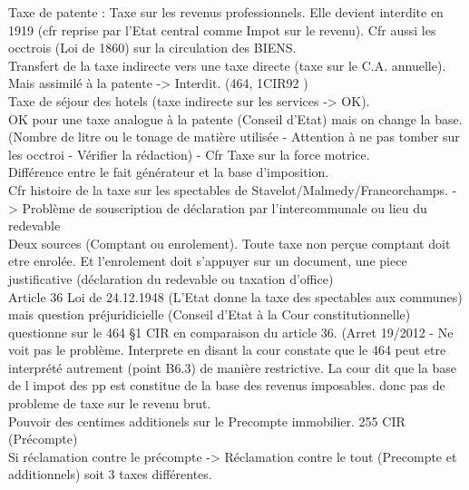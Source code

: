 \documentclass{book}
\begin{document}
\null

Taxe de patente : Taxe sur les revenus professionnels. Elle devient interdite en 1919 (cfr reprise par l'Etat central comme Impot sur le revenu). Cfr aussi les occtrois (Loi de 1860) sur la circulation des BIENS.\\

Transfert de la taxe indirecte vers une taxe directe (taxe sur le C.A. annuelle). Mais assimilé à la patente -> Interdit. (464, 1\degre CIR92 )\\

Taxe de séjour des hotels (taxe indirecte sur les services -> OK).\\

OK pour une taxe analogue à la patente (Conseil d'Etat) mais on change la base. (Nombre de litre ou le tonage de matière utilisée - Attention à ne pas tomber sur les occtroi - Vérifier la rédaction) - Cfr Taxe sur la force motrice.\\

Différence entre le fait générateur et la base d'imposition.\\

Cfr histoire de la taxe sur les spectables de Stavelot/Malmedy/Francorchamps. -> Problème de souscription de déclaration par l'intercommunale ou lieu du redevable\\

Deux sources (Comptant ou enrolement). Toute taxe non perçue comptant doit etre enrolée. Et l'enrolement doit s'appuyer sur un document, une piece justificative (déclaration du redevable ou taxation d'office)\\

Article 36 Loi de 24.12.1948 (L'Etat donne la taxe des spectables aux communes) mais question préjuridicielle (Conseil  d'Etat à la Cour constitutionnelle) questionne sur le 464 §1 CIR en comparaison du article 36. (Arret 19/2012 - Ne voit pas le problème. Interprete en disant la cour constate que le 464 peut etre interprété autrement (point B6.3) de manière restrictive. La cour dit que la base de l impot des pp est constitue de la base des revenus imposables. donc pas de probleme de taxe sur le revenu brut.\\

Pouvoir des centimes additionels sur le Precompte immobilier. 255 CIR (Précompte)\\

Si réclamation contre le précompte -> Réclamation contre le tout (Precompte et additionnels) soit 3 taxes différentes.\\
\end{document}
